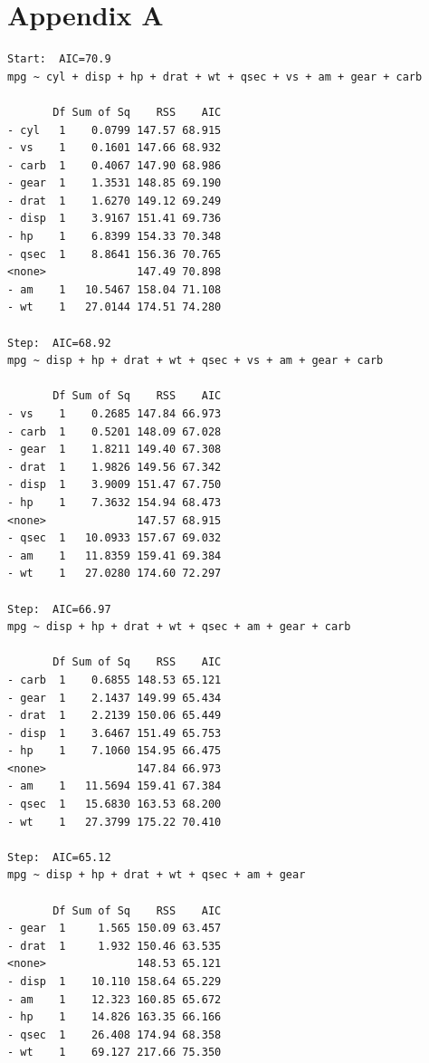\documentclass{article}\usepackage[]{graphicx}\usepackage[]{xcolor}
\numberwithin{equation}{section}
\begin{document}
{  

\newpage

 
\newpage

\appendix
\section{Appendix A}

\begin{verbatim}
Start:  AIC=70.9
mpg ~ cyl + disp + hp + drat + wt + qsec + vs + am + gear + carb

       Df Sum of Sq    RSS    AIC
- cyl   1    0.0799 147.57 68.915
- vs    1    0.1601 147.66 68.932
- carb  1    0.4067 147.90 68.986
- gear  1    1.3531 148.85 69.190
- drat  1    1.6270 149.12 69.249
- disp  1    3.9167 151.41 69.736
- hp    1    6.8399 154.33 70.348
- qsec  1    8.8641 156.36 70.765
<none>              147.49 70.898
- am    1   10.5467 158.04 71.108
- wt    1   27.0144 174.51 74.280

Step:  AIC=68.92
mpg ~ disp + hp + drat + wt + qsec + vs + am + gear + carb

       Df Sum of Sq    RSS    AIC
- vs    1    0.2685 147.84 66.973
- carb  1    0.5201 148.09 67.028
- gear  1    1.8211 149.40 67.308
- drat  1    1.9826 149.56 67.342
- disp  1    3.9009 151.47 67.750
- hp    1    7.3632 154.94 68.473
<none>              147.57 68.915
- qsec  1   10.0933 157.67 69.032
- am    1   11.8359 159.41 69.384
- wt    1   27.0280 174.60 72.297

Step:  AIC=66.97
mpg ~ disp + hp + drat + wt + qsec + am + gear + carb

       Df Sum of Sq    RSS    AIC
- carb  1    0.6855 148.53 65.121
- gear  1    2.1437 149.99 65.434
- drat  1    2.2139 150.06 65.449
- disp  1    3.6467 151.49 65.753
- hp    1    7.1060 154.95 66.475
<none>              147.84 66.973
- am    1   11.5694 159.41 67.384
- qsec  1   15.6830 163.53 68.200
- wt    1   27.3799 175.22 70.410

Step:  AIC=65.12
mpg ~ disp + hp + drat + wt + qsec + am + gear

       Df Sum of Sq    RSS    AIC
- gear  1     1.565 150.09 63.457
- drat  1     1.932 150.46 63.535
<none>              148.53 65.121
- disp  1    10.110 158.64 65.229
- am    1    12.323 160.85 65.672
- hp    1    14.826 163.35 66.166
- qsec  1    26.408 174.94 68.358
- wt    1    69.127 217.66 75.350


\end{verbatim}}
\end{document}
